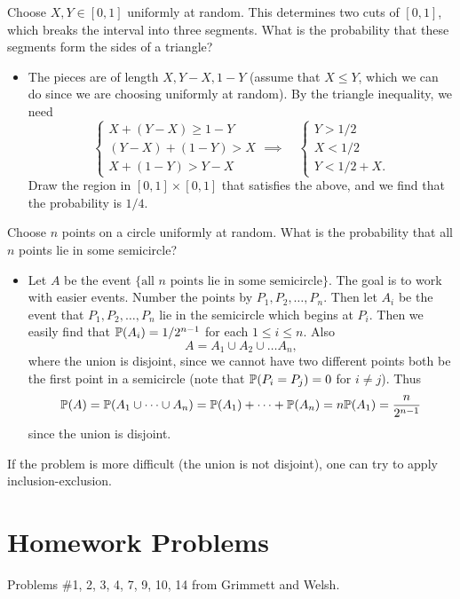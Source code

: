 \begin{example}
  Choose $X, Y \in [0, 1]$ uniformly at random.
  This determines two cuts of $[0, 1]$, which
  breaks the interval into three segments. What is
  the probability that these segments form the
  sides of a triangle?
  \begin{itemize}
    \item
  The pieces are of length $X, Y - X, 1 - Y$
  (assume that $X \le Y$, which we can do since
  we are choosing uniformly at random).
      By the triangle inequality, we need
      \[
        \begin{cases}
          X + (Y - X) \ge 1 - Y \\
          (Y - X) + (1 - Y) > X \\
          X + (1 - Y) > Y - X
        \end{cases}
        \implies \quad
        \begin{cases}
          Y > 1 / 2 \\
          X < 1 / 2 \\
          Y < 1 / 2 + X.
        \end{cases}
      \]
      Draw the region in $[0, 1] \times [0, 1]$ that
      satisfies the above, and we find that the probability
      is $1 / 4$.
  \end{itemize}
\end{example}

\begin{example}
  Choose $n$ points on a circle uniformly
  at random. What is the probability that
  all $n$ points lie in some semicircle?
  \begin{itemize}
    \item Let $A$ be the event
      $\{\text{all $n$ points lie in some semicircle}\}$.
      The goal is to work with easier events.
      Number the points by $P_1, P_2, \dots, P_n$.
      Then let $A_i$ be the event that
      $P_1, P_2, \dots, P_n$ lie in the semicircle
      which begins at $P_i$. Then we easily find that
      $\mathbb{P}(A_i) = 1 / 2^{n - 1}$ for each $1 \le i \le n$.
      Also
      \[
        A = A_1 \cup A_2 \cup \dots A_n,
      \]
      where the union is disjoint, since we cannot
      have two different points both be the first point
      in a semicircle (note that $\mathbb{P}(P_i = P_j) = 0$
      for $i \ne j$). Thus
      \[
        \mathbb{P}(A) = \mathbb{P}(A_1 \cup \dots \cup A_n)
        = \mathbb{P}(A_1) + \dots + \mathbb{P}(A_n)
        = n \mathbb{P}(A_1) = \frac{n}{2^{n - 1}}
      \]
      since the union is disjoint.
  \end{itemize}
  If the problem is more difficult (the union is
  not disjoint), one can try to apply
  inclusion-exclusion.
\end{example}

\section{Homework Problems}
Problems \#1, 2, 3, 4, 7, 9, 10, 14 from Grimmett and Welsh.
